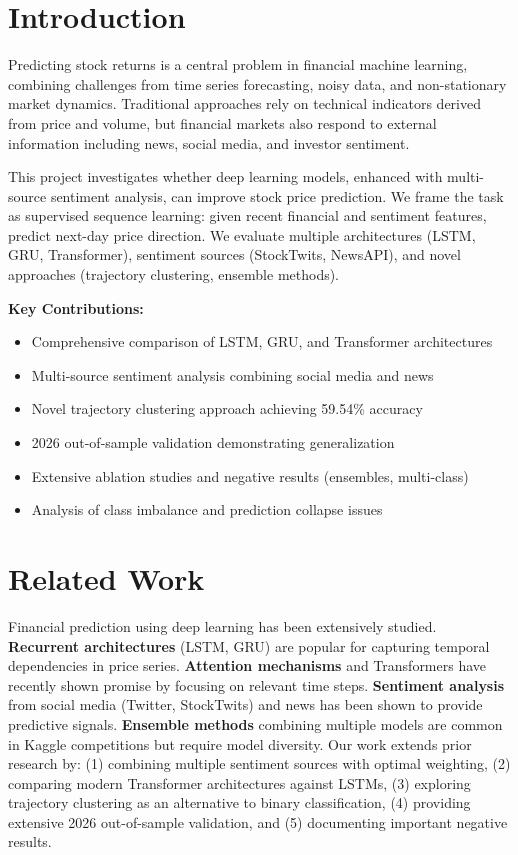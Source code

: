 \documentclass[10pt,twocolumn]{article}
\begin{document}
\vspace{1em}

\section{Introduction}

Predicting stock returns is a central problem in financial machine learning, combining challenges from time series forecasting, noisy data, and non-stationary market dynamics. Traditional approaches rely on technical indicators derived from price and volume, but financial markets also respond to external information including news, social media, and investor sentiment.

This project investigates whether deep learning models, enhanced with multi-source sentiment analysis, can improve stock price prediction. We frame the task as supervised sequence learning: given recent financial and sentiment features, predict next-day price direction. We evaluate multiple architectures (LSTM, GRU, Transformer), sentiment sources (StockTwits, NewsAPI), and novel approaches (trajectory clustering, ensemble methods).

\textbf{Key Contributions:}
\begin{itemize}
\item Comprehensive comparison of LSTM, GRU, and Transformer architectures
\item Multi-source sentiment analysis combining social media and news
\item Novel trajectory clustering approach achieving 59.54\% accuracy
\item 2026 out-of-sample validation demonstrating generalization
\item Extensive ablation studies and negative results (ensembles, multi-class)
\item Analysis of class imbalance and prediction collapse issues
\end{itemize}

\section{Related Work}

Financial prediction using deep learning has been extensively studied. \textbf{Recurrent architectures} (LSTM, GRU) are popular for capturing temporal dependencies in price series. \textbf{Attention mechanisms} and Transformers have recently shown promise by focusing on relevant time steps. \textbf{Sentiment analysis} from social media (Twitter, StockTwits) and news has been shown to provide predictive signals. \textbf{Ensemble methods} combining multiple models are common in Kaggle competitions but require model diversity. Our work extends prior research by: (1) combining multiple sentiment sources with optimal weighting, (2) comparing modern Transformer architectures against LSTMs, (3) exploring trajectory clustering as an alternative to binary classification, (4) providing extensive 2026 out-of-sample validation, and (5) documenting important negative results.
\end{document}
